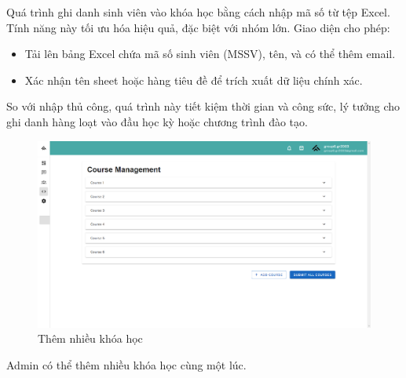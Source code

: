Quá trình ghi danh sinh viên vào khóa học bằng cách nhập mã số từ tệp Excel. Tính năng này tối ưu hóa hiệu quả, đặc biệt với nhóm lớn. Giao diện cho phép:
\begin{itemize}
    \item Tải lên bảng Excel chứa mã số sinh viên (MSSV), tên, và có thể thêm email.
    \item Xác nhận tên sheet hoặc hàng tiêu đề để trích xuất dữ liệu chính xác.
\end{itemize}
So với nhập thủ công, quá trình này tiết kiệm thời gian và công sức, lý tưởng cho ghi danh hàng loạt vào đầu học kỳ hoặc chương trình đào tạo.
\begin{figure}[H]
    \centering
    \includegraphics[width=0.6\linewidth]{images/admin_add_courses.png}
    \caption{Thêm nhiều khóa học}
    \label{fig:enter-label}
\end{figure}

Admin có thể thêm nhiều khóa học cùng một lúc.
